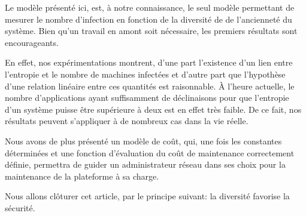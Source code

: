 Le modèle présenté ici, est, à notre connaissance, le seul modèle permettant de mesurer le nombre d'infection en fonction de la
diversité de de l'ancienneté du système. Bien qu'un travail en amont soit nécessaire, les premiers résultats sont encourageants. 
\newline

En effet, nos expérimentations montrent, d'une part l'existence d'un lien entre l'entropie et le nombre de machines infectées et d'autre part que l'hypothèse d'une
relation linéaire entre ces quantités est raisonnable. \`A l'heure actuelle, le nombre d'applications ayant suffisamment de
déclinaisons pour que l'entropie d'un système puisse être supérieure à deux est en effet très faible. De ce fait, nos résultats
peuvent s'appliquer à de nombreux cas dans la vie réelle. 
\newline

Nous avons de plus présenté un modèle de coût, qui, une fois les constantes déterminées et une fonction d'évaluation du coût de
maintenance correctement définie, permettra de guider un administrateur réseau dans ses choix pour la maintenance de la
plateforme à sa charge.
\newline

Nous allons clôturer cet article, par le principe suivant: la diversité favorise la sécurité.
